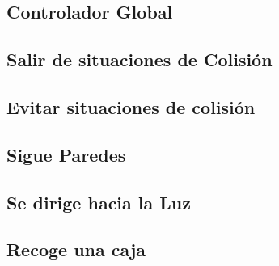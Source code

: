 \documentclass[12pt,a4paper]{article}
\begin{document}
\subsection{Controlador Global}
\subsection{Salir de situaciones de Colisión}
\subsection{Evitar situaciones de colisión}
\subsection{Sigue Paredes}
\subsection{Se dirige hacia la Luz}
\subsection{Recoge una caja}
\end{document}
